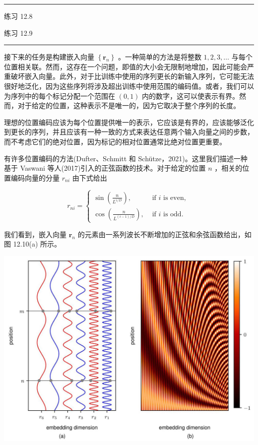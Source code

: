 \documentclass[10pt]{report}
\newcommand{\HRule}{\begin{center}\rule{0.9\linewidth}{0.2mm}\end{center}}
\begin{document}
\HRule

练习 12.8

练习 12.9

\HRule

接下来的任务是构建嵌入向量 \(\left\{  {\mathbf{r}}_{n}\right\}\) 。一种简单的方法是将整数 \(1,2,3,\ldots\) 与每个位置相关联。然而，这存在一个问题，即值的大小会无限制地增加，因此可能会严重破坏嵌入向量。此外，对于比训练中使用的序列更长的新输入序列，它可能无法很好地泛化，因为这些序列将涉及超出训练中使用范围的编码值。或者，我们可以为序列中的每个标记分配一个范围在 \(\left( {0,1}\right)\) 内的数字，这可以使表示有界。然而，对于给定的位置，这种表示不是唯一的，因为它取决于整个序列的长度。

理想的位置编码应该为每个位置提供唯一的表示，它应该是有界的，应该能够泛化到更长的序列，并且应该有一种一致的方式来表达任意两个输入向量之间的步数，而不考虑它们的绝对位置，因为标记的相对位置通常比绝对位置更重要。

有许多位置编码的方法(Dufter、Schmitt 和 Schütze，2021)。这里我们描述一种基于 Vaswani 等人(2017)引入的正弦函数的技术。对于给定的位置 \(n\) ，相关的位置编码向量的分量 \({r}_{ni}\) 由下式给出

\[
{r}_{ni} = \left\{  \begin{array}{ll} \sin \left( \frac{n}{{L}^{i/D}}\right) , & \text{ if }i\text{ is even, } \\  \cos \left( \frac{n}{{L}^{\left( {i - 1}\right) /D}}\right) , & \text{ if }i\text{ is odd. } \end{array}\right.  \tag{12.25}
\]

我们看到，嵌入向量 \({\mathbf{r}}_{n}\) 的元素由一系列波长不断增加的正弦和余弦函数给出，如图 12.10(a) 所示。

\begin{center}
\includegraphics[max width=1.0\textwidth]{images/0194e279-9b28-703a-88f4-c3ac21e2010d_392_232_598_1291_955_0.jpg}
\end{center}
\hspace*{3em} 
\end{document}

